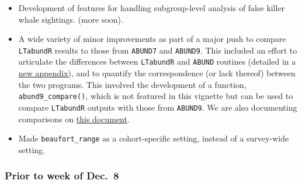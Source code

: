 \documentclass[
]{book}
\begin{document}
\begin{itemize}
\item
  Development of features for handling subgroup-level analysis of false killer whale sightings. (more soon).
\item
  A wide variety of minor improvements as part of a major push to compare \texttt{LTabundR} results to those from \texttt{ABUND7} and \texttt{ABUND9}. This included an effort to articulate the differences between \texttt{LTabundR} and \texttt{ABUND} routines (detailed in a \protect\hyperlink{abund9_compare}{new appendix}), and to quantify the correspondence (or lack thereof) between the two programs. This involved the development of a function, \texttt{abund9\_compare()}, which is not featured in this vignette but can be used to compare \texttt{LTabundR} outputs with those from \texttt{ABUND9}. We are also documenting comparisons on \href{https://docs.google.com/document/d/1_EZqzOnwSZZCitqTJFIbznGy2Njwbj1YOqMQcbcHI7k/edit?usp=sharing}{this document}.
\item
  Made \texttt{beaufort\_range} as a cohort-specific setting, instead of a survey-wide setting.
\end{itemize}

\hypertarget{prior-to-week-of-dec.-8}{%
\subsubsection*{Prior to week of Dec.~8}\label{prior-to-week-of-dec.-8}}
\end{document}
